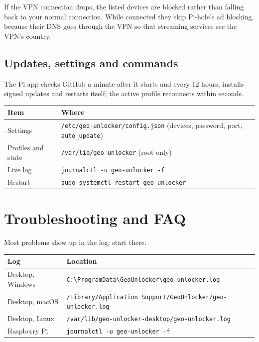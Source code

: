 \documentclass[11pt,a4paper]{article}
\newcommand{\file}[1]{\texttt{#1}}          %
\begin{document}
If the VPN connection drops, the listed devices are blocked rather than falling back to your normal connection. While connected they skip Pi-hole's ad blocking, because their DNS goes through the VPN so that streaming services see the VPN's country.

\subsection{Updates, settings and commands}

The Pi app checks GitHub a minute after it starts and every 12 hours, installs signed updates and restarts itself; the active profile reconnects within seconds.

\begin{center}
\begin{tabularx}{\linewidth}{@{}l L@{}}
\toprule
\textbf{Item} & \textbf{Where} \\
\midrule
Settings & \file{/etc/geo-unlocker/config.json} (devices, password, port, \file{auto\_update}) \\
Profiles and state & \file{/var/lib/geo-unlocker} (root only) \\
Live log & \file{journalctl -u geo-unlocker -f} \\
Restart & \file{sudo systemctl restart geo-unlocker} \\
\bottomrule
\end{tabularx}
\end{center}

\section{Troubleshooting and FAQ}

Most problems show up in the log; start there.

\begin{center}
\begin{tabularx}{\linewidth}{@{}l L@{}}
\toprule
\textbf{Log} & \textbf{Location} \\
\midrule
Desktop, Windows & \file{C:\textbackslash ProgramData\textbackslash GeoUnlocker\textbackslash geo-unlocker.log} \\
Desktop, macOS & \file{/Library/Application Support/GeoUnlocker/geo-unlocker.log} \\
Desktop, Linux & \file{/var/lib/geo-unlocker-desktop/geo-unlocker.log} \\
Raspberry Pi & \file{journalctl -u geo-unlocker -f} \\
\bottomrule
\end{tabularx}
\end{center}
\end{document}

